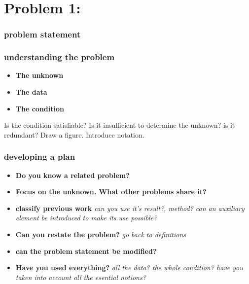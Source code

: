 \documentclass[11pt]{article}
\begin{document}
\maketitle

\section*{Problem 1:} 

\subsubsection*{problem statement}

\subsubsection*{understanding the problem}

\begin{itemize}
 \item \textbf{The unknown}
 \item \textbf{The data} 
 \item \textbf{The condition} 
\end{itemize}

Is the condition satisfiable? Is it insufficient to determine the unknown? is it redundant?
Draw a figure. Introduce notation.

\subsubsection*{developing a plan}

\begin{itemize}
 \item \textbf{Do you know a related problem?}
 \item \textbf{Focus on the unknown. What other problems share it?}
 \item \textbf{classify previous work} \textit{can you use it's result?, method? can an auxiliary element be introduced to make its use possible?}
 \item \textbf{Can you restate the problem?} \textit{go back to definitions}
 \item \textbf{can the problem statement be modified?}
 \item \textbf{Have you used everything?} \textit{all the data? the whole condition? have you taken into account all the esential notions?}
\end{itemize}
\end{document}
